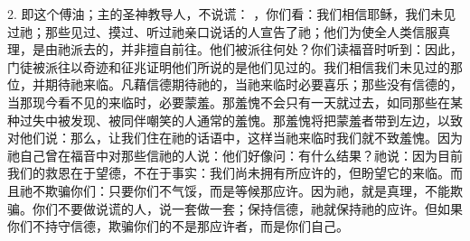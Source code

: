 2. 即这个傅油；主的圣神教导人，不说谎： ，你们看：我们相信耶稣，我们未见过祂；那些见过、摸过、听过祂亲口说话的人宣告了祂；他们为使全人类信服真理，是由祂派去的，并非擅自前往。他们被派往何处？你们读福音时听到：因此，门徒被派往以奇迹和征兆证明他们所说的是他们见过的。我们相信我们未见过的那位，并期待祂来临。凡藉信德期待祂的，当祂来临时必要喜乐；那些没有信德的，当那现今看不见的来临时，必要蒙羞。那羞愧不会只有一天就过去，如同那些在某种过失中被发现、被同伴嘲笑的人通常的羞愧。那羞愧将把蒙羞者带到左边，以致对他们说：那么，让我们住在祂的话语中，这样当祂来临时我们就不致羞愧。因为祂自己曾在福音中对那些信祂的人说：他们好像问：有什么结果？祂说：因为目前我们的救恩在于望德，不在于事实：我们尚未拥有所应许的，但盼望它的来临。而且祂不欺骗你们：只要你们不气馁，而是等候那应许。因为祂，就是真理，不能欺骗。你们不要做说谎的人，说一套做一套；保持信德，祂就保持祂的应许。但如果你们不持守信德，欺骗你们的不是那应许者，而是你们自己。\par

